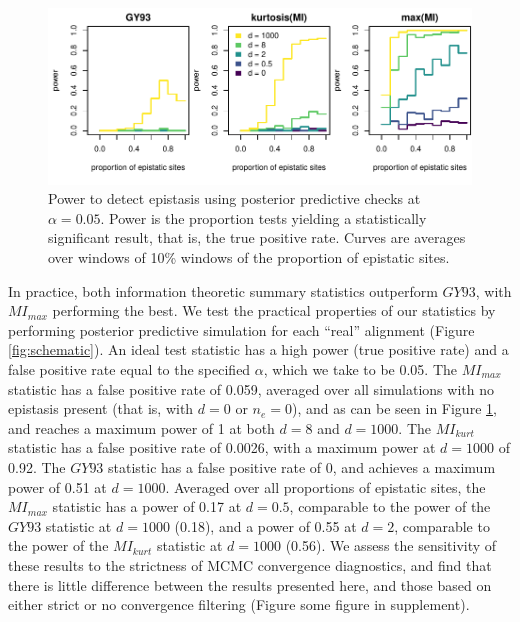 \documentclass[11pt]{article}
\begin{document}
\begin{figure}
  \centering
  \includegraphics[width=\textwidth]{figures/power_curves.pdf}
  \caption{
  Power to detect epistasis using posterior predictive checks at $\alpha = 0.05$.
  Power is the proportion tests yielding a statistically significant result, that is, the true positive rate.
  Curves are averages over windows of 10\% windows of the proportion of epistatic sites.
  }
  \label{fig:power_curves}
\end{figure}

In practice, both information theoretic summary statistics outperform $GY93$, with $MI_{max}$ performing the best.
We test the practical properties of our statistics by performing posterior predictive simulation for each ``real'' alignment (Figure \ref{fig:schematic}).
An ideal test statistic has a high power (true positive rate) and a false positive rate equal to the specified $\alpha$, which we take to be 0.05.
The $MI_{max}$ statistic has a false positive rate of 0.059, averaged over all simulations with no epistasis present (that is, with $d = 0$ or $n_e = 0$), and as can be seen in Figure \ref{fig:power_curves}, and reaches a maximum power of 1 at both $d = 8$ and $d = 1000$.
The $MI_{kurt}$ statistic has a false positive rate of 0.0026, with a maximum power at $d = 1000$ of 0.92.
The $GY93$ statistic has a false positive rate of 0, and achieves a maximum power of 0.51 at $d = 1000$.
Averaged over all proportions of epistatic sites, the $MI_{max}$ statistic has a power of 0.17 at $d = 0.5$, comparable to the power of the $GY93$ statistic at $d = 1000$ (0.18), and a power of 0.55 at $d = 2$, comparable to the power of the $MI_{kurt}$ statistic at $d = 1000$ (0.56).
We assess the sensitivity of these results to the strictness of MCMC convergence diagnostics, and find that there is little difference between the results presented here, and those based on either strict or no convergence filtering (Figure some figure in supplement).
\end{document}
